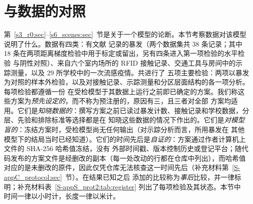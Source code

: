 \section{与数据的对照}\label{s8_outbreaks:sec}\label{s8b_evidence:sec}

第~\ref{s3_r0:sec}--\ref{s6_scenes:sec}~节是关于一个模型的论断。本节考察数据对该模型说明了什么。数据有四类：有文献
记录的暴发（两个数据集共 38 条记录；其中 18 条在两项距离梯度检验中用于标定或留出，另有四条进入第一项检验的水平检验
与阴性对照）、来自六个室内场所的 RFID 接触记录、交通工具与房间中的示踪测量，以及 29 所学校中的一次流感疫情。共进行了
五项主要检验：两项以暴发为对照的样本外检验，以及对接触记录、示踪测量和分区层面结构的各一项分析。每项检验都遵循一份
在受检模型于其数据上运行之前即已确定的方案。我们称这些方案为\emph{预先设定的}，而不称为预注册的，原因有三，且三者对全部
方案均适用。它们是\emph{知晓数据的}：撰写方案之前已读过暴发计数、接触记录和学校数据，分层、先验和排除标准等选择都是在
知晓这些数据的情况下作出的。它们是\emph{对模型盲的}：冻结方案时，受检模型尚无任何输出（对示踪分析而言，所用暴发在
其他模型下的结局当时已经知道）。它们的时间先后是\emph{自证的}：方案通过作者计算机上文件的 SHA-256 哈希值冻结，没有
外部时间戳、版本控制历史或登记平台；随代码发布的方案文件是经删改的副本（每一处改动的行都在仓库中列出），而哈希值
对应的是未删改的原件，因此仅凭仓库无法核查这一时间先后（补充材料第~\ref{S-appC_protocol:sec}~节）。在结果已知之后
添加的比较称为\emph{事后}比较，并一律标明；补充材料表~\ref{S-appS_prot2:tab:register} 列出了每项检验及其状态。本节中
时间一律以小时计，长度一律以米计。


